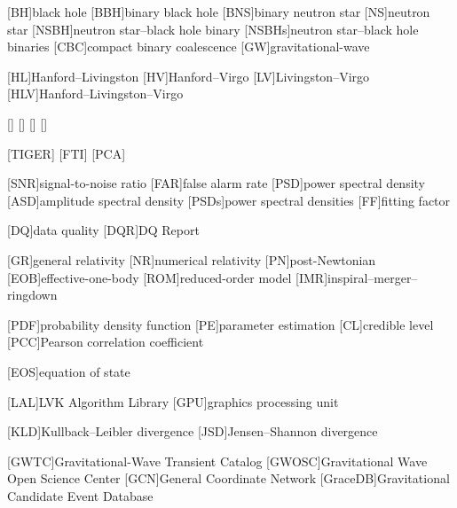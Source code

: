 [BH]{black hole}
[BBH]{binary black hole}
[BNS]{binary neutron star}
[NS]{neutron star}
[NSBH]{neutron star--black hole binary}
[NSBHs]{neutron star--black hole binaries}
[CBC]{compact binary coalescence}
[GW]{gravitational-wave}

[HL]{Hanford--Livingston}
[HV]{Hanford--Virgo}
[LV]{Livingston--Virgo}
[HLV]{Hanford--Livingston--Virgo}

[\CWB{}]{}
[\MBTA{}]{}
[\SPIIR{}]{}
[\GSTLAL{}]{}


[TIGER]{}
[FTI]{}
[PCA]{}

[SNR]{signal-to-noise ratio}
[FAR]{false alarm rate}
[PSD]{power spectral density}
[ASD]{amplitude spectral density}
[PSDs]{power spectral densities}
[FF]{fitting factor}

[DQ]{data quality}
[DQR]{\ac{DQ} Report}

[GR]{general relativity}
[NR]{numerical relativity}
[PN]{post-Newtonian}
[EOB]{effective-one-body}
[ROM]{reduced-order model}
[IMR]{inspiral--merger--ringdown}

[PDF]{probability density function}
[PE]{parameter estimation}
[CL]{credible level}
[PCC]{Pearson correlation coefficient}

[EOS]{equation of state}

[LAL]{\ac{LVK} Algorithm Library}
[GPU]{graphics processing unit}

[KLD]{Kullback--Leibler divergence}
[JSD]{Jensen--Shannon divergence}

[GWTC]{Gravitational-Wave Transient Catalog}
[GWOSC]{Gravitational Wave Open Science Center}
[GCN]{General Coordinate Network}
[GraceDB]{Gravitational Candidate Event Database}

